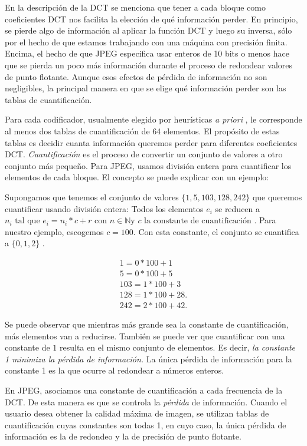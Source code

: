 En la descripción de la DCT se menciona que tener a cada bloque como
coeficientes DCT nos facilita la elección de qué información perder. En
principio, se pierde algo de información al aplicar la función DCT y luego su
inversa, sólo por el hecho de que estamos trabajando con una máquina con
precisión finita. Encima, el hecho de que JPEG especifica usar enteros de 10
bits o menos hace que se pierda un poco más información durante el proceso de
redondear valores de punto flotante. Aunque esos efectos de pérdida de
información no son negligibles, la principal manera en que se elige qué
información perder son las \gls{tablas de cuantificación}.

Para cada codificador, usualmente elegido por heurísticas \emph{ a priori }, le
corresponde al menos dos tablas de cuantificación de 64 elementos. El propósito
de estas tablas es decidir cuanta información queremos perder para diferentes
coeficientes DCT. \emph{Cuantificación} es el proceso de convertir un conjunto
de valores a otro conjunto más pequeño. Para JPEG, usamos división entera para
cuantificar los elementos de cada bloque. El concepto se puede explicar con un
ejemplo:

Supongamos que tenemos el conjunto de valores $ \{ 1, 5, 103, 128, 242 \} $ que
queremos cuantificar usando división entera: Todos los elementos $e_i$ se
reducen a $ n_i \text{ tal que } e_i = n_i * c + r \text{ con } n \in ℕ \text{
y } c \text{ la constante de cuantificación }$. Para nuestro ejemplo, escogemos
$ c = 100 $. Con esta constante, el conjunto se cuantifica a $ \{ 0, 1, 2 \}$ .

\begin{eqnarray*}
    1 = 0 * 100 + 1 \\
    5 = 0 * 100 + 5 \\
    103 = 1 * 100 + 3 \\
    128 = 1 * 100 + 28. \\
    242 = 2 * 100 + 42.
\end{eqnarray*}

Se puede observar que mientras más grande sea la constante de cuantificación,
más elementos van a reducirse. También se puede ver que cuantificar con una
constante de $1$ resulta en el mismo conjunto de elementos. Es decir, \emph{ la
constante 1 minimiza la pérdida de información.} La única pérdida de
información para la constante 1 es la que ocurre al redondear a números
enteros.

En JPEG, asociamos una constante de cuantificación a cada frecuencia de la DCT.
De esta manera es que se controla la \emph{pérdida} de información. Cuando el
usuario desea obtener la calidad máxima de imagen, se utilizan tablas de
cuantificación cuyas constantes son todas 1, en cuyo caso, la única pérdida de
información es la de redondeo y la de precisión de punto flotante.

